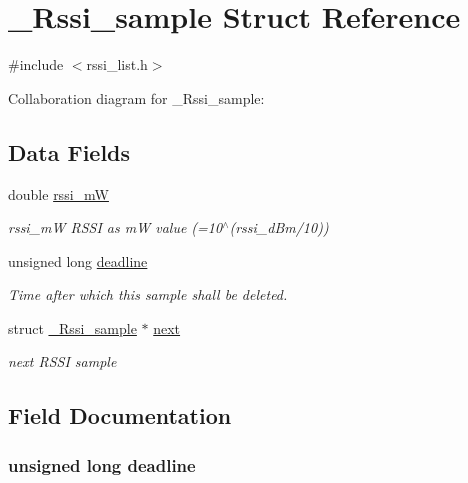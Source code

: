 \hypertarget{struct___rssi__sample}{}\section{\+\_\+\+Rssi\+\_\+sample Struct Reference}
\label{struct___rssi__sample}


{\ttfamily \#include $<$rssi\+\_\+list.\+h$>$}



Collaboration diagram for \+\_\+\+Rssi\+\_\+sample\+:
\subsection*{Data Fields}
\begin{DoxyCompactItemize}
\item 
double \hyperlink{struct___rssi__sample_a76ef1fbf61be7fe0f22106b96e3b08df}{rssi\+\_\+m\+W}
\begin{DoxyCompactList}\small\item\em rssi\+\_\+m\+W R\+S\+S\+I as m\+W value (=10$^\wedge$(rssi\+\_\+d\+Bm/10)) \end{DoxyCompactList}\item 
unsigned long \hyperlink{struct___rssi__sample_ac3c1dc72faeffa7f8538745fc616c859}{deadline}
\begin{DoxyCompactList}\small\item\em Time after which this sample shall be deleted. \end{DoxyCompactList}\item 
struct \hyperlink{struct___rssi__sample}{\+\_\+\+Rssi\+\_\+sample} $\ast$ \hyperlink{struct___rssi__sample_a32a692b80ab2d5ec54fffa4a8b4d4870}{next}
\begin{DoxyCompactList}\small\item\em next R\+S\+S\+I sample \end{DoxyCompactList}\end{DoxyCompactItemize}


\subsection{Field Documentation}
\hypertarget{struct___rssi__sample_ac3c1dc72faeffa7f8538745fc616c859}{}
\subsubsection[{deadline}]{\setlength{\rightskip}{0pt plus 5cm}unsigned long deadline}\label{struct___rssi__sample_ac3c1dc72faeffa7f8538745fc616c859}



